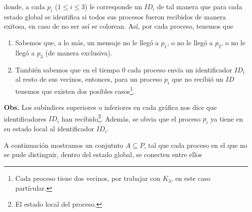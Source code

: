donde, a cada $p_i$ ($1 \leq i \leq 3$) le corresponde un $ID_i$ de
tal manera que para cada estado global se identifica si todos sus
procesos fueron recibidos de manera exitosa, en caso de no ser así
se colorean.
Así, por cada proceso, tenemos que
\begin{enumerate}
\item Sabemos que, a lo más, un mensaje no le llegó a $p_1$,
o no le llegó a $p_2$, o no le llegó a $p_3$ (de manera exclusiva).
\item También sabemos que en el tiempo $0$ cada proceso envía
un identificador $ID_i$ al resto de sus vecinos, entonces,
para un proceso $p_i$ que no recibió un $ID$ tenemos que existen
dos posibles casos\footnote{Cada proceso tiene dos vecinos, por trabajar
con $K_3$, en este caso partícular.}.
\end{enumerate}

\textbf{Obs.} Los subíndices superiores o inferiores en cada gráfica
nos dice que identificadores $ID_i$ han recibido\footnote{El estado local
del proceso.}. Además, se obvia que el proceso $p_i$ ya tiene en su
estado local al identificador $ID_i$.
\newline

A continuación mostramos un conjutnto  $A \subseteq P$, tal que cada proceso
en el que no se pude distinguir, dentro del estado global, se conecten entre
ellos

